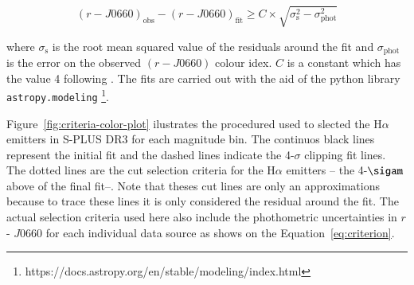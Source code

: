 \documentclass[fleqn,usenatbib]{mnras}
\begin{document}
\begin{equation}
  (r - J0660)_{\mathrm{obs}} - (r - J0660)_{\mathrm{fit}} \geq C \times \sqrt{\sigma^2_{\mathrm{s}} - \sigma^2_{\mathrm{phot}}}
  \label{eq:criterion}
\end{equation}
 
 where $\sigma_{\mathrm{s}}$ is the root mean squared value of the residuals around
 the fit and $\sigma_{\mathrm{phot}}$ is the error on the observed $(r - J0660)$ colour idex.
 $C$ is a constant which has the value 4 following \citet{Wevers:2017}.
The fits are carried out with the aid of the python library \texttt{astropy.modeling}
\footnote{https://docs.astropy.org/en/stable/modeling/index.html}.

Figure~\ref{fig:criteria-color-plot} ilustrates the procedured used to slected the H{$\alpha$}
emitters in S-PLUS DR3 for each magnitude bin. The continuos black lines represent the initial
fit and  the dashed lines indicate the 4-$\sigma$ clipping fit lines. The dotted lines are
the cut selection criteria for the H{$\alpha$} emitters -- the 4-$\sigam$ above of the final
fit--. Note that theses cut lines are only an approximations because to trace these lines
it is only considered the residual around the fit. The actual selection criteria used here
also include the phothometric uncertainties in $r$ - $J$0660 for each individual data source as
shows on the Equation~\ref{eq:criterion}.
\end{document}
